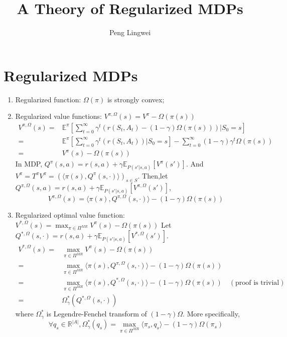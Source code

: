 \documentclass[a4paper]{article}
\title{A Theory of Regularized MDPs}
\author{Peng Lingwei}
\begin{document}
\maketitle
\tableofcontents
\newpage

\section{Regularized MDPs}%

\begin{enumerate}
    \item Regularized function: $ \Omega(\pi) $ is strongly convex;
    \item Regularized value functions: $ V^{\pi, \Omega}(s) = V^{\pi} - \Omega(\pi(s))$
        \begin{align*}
            V^{\pi, \Omega}(s) =& \mathbb{E}^{\pi}\left[ \sum^{\infty}_{t=0} \gamma^t (r(S_t, A_t) - (1-\gamma)\Omega(\pi(s))) \vert S_0 = s \right] \\
            =& \mathbb{E}^{\pi}\left[ \sum^{\infty}_{t=0} \gamma^t (r(S_t, A_t)) \vert S_0 = s \right] - \sum^{\infty}_{t=0} (1-\gamma) \gamma^t \Omega(\pi(s)) \\
            =& V^{\pi}(s) - \Omega(\pi(s))
        \end{align*}
        In MDP, $ Q^{\pi}(s,a) = r(s,a) + \gamma \mathbb{E}_{P(s'|s,a)}\left[ V^{\pi}(s') \right] $. And $ V^{\pi} = T^{\pi}V^{\pi} = {\left( \langle \pi(s), Q^{\pi}(s, \cdot) \rangle \right)}_{s \in S} $. 
        Then,let $ Q^{\pi, \Omega}(s,a) = r(s,a) + \gamma \mathbb{E}_{P(s'|s,a)}\left[ V^{\pi, \Omega}(s') \right] $,
        \[
            V^{\pi, \Omega}(s) = \langle \pi(s), Q^{\pi, \Omega}(s, \cdot) \rangle - (1-\gamma)\Omega(\pi(s))
        \]
    \item Regularized optimal value function: $ V^{*, \Omega}(s) = \max_{\pi \in \Pi^{MR}} V^{\pi}(s) - \Omega(\pi(s)) $
        Let $ Q^{*, \Omega}(s, \cdot) = r(s,a) + \gamma \mathbb{E}_{P(s'|s,a)}\left[ V^{*,\Omega}(s') \right] $.
        \begin{align*}
            V^{*, \Omega}(s) =& \max_{\pi \in \Pi^{MR}} V^{\pi}(s) - \Omega(\pi(s))\\
            =& \max_{\pi \in \Pi^{MR}} \langle \pi(s), Q^{\pi, \Omega}(s, \cdot) \rangle- (1 - \gamma)\Omega(\pi(s))\\
            =& \max_{\pi \in \Pi^{MR}} \langle \pi(s), Q^{*, \Omega}(s, \cdot) \rangle- (1 - \gamma)\Omega(\pi(s)) \quad (\text{proof is trivial})\\
            =& \Omega^{*}_{\gamma}(Q^{*,\Omega}(s,\cdot))
        \end{align*}
        where $ \Omega_{\gamma}^{*} $ is Legendre-Fenchel transform of $ (1-\gamma)\Omega $. More specifically,
        \[
            \forall q_s \in \mathbb{R}^{\left| A \right|}, \Omega_{\gamma}^{*}(q_s) 
            = \max_{\pi \in \Pi^{MR}} \langle \pi_s, q_s \rangle - (1- \gamma) \Omega(\pi_s)
        \]
        

\end{enumerate}
\end{document}
